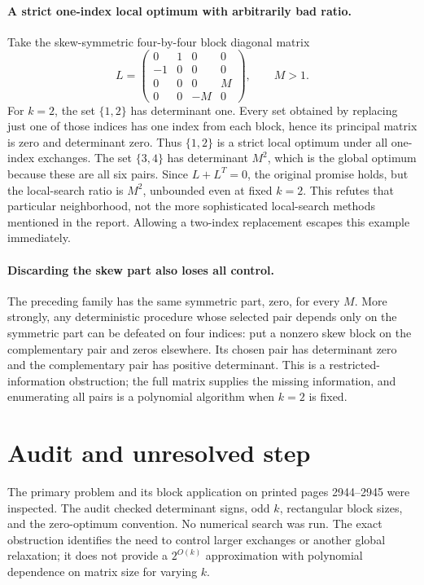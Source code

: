 \documentclass[11pt]{article}
\begin{document}
\paragraph{A strict one-index local optimum with arbitrarily bad ratio.}
Take the skew-symmetric four-by-four block diagonal matrix
\[
L=\begin{pmatrix}
0&1&0&0\\-1&0&0&0\\0&0&0&M\\0&0&-M&0
\end{pmatrix},\qquad M>1.
\]
For $k=2$, the set $\{1,2\}$ has determinant one. Every
set obtained by replacing just one of those indices has one index
from each block, hence its principal matrix is zero and determinant
zero. Thus $\{1,2\}$ is a strict local optimum under all
one-index exchanges. The set $\{3,4\}$ has determinant $M^2$,
which is the global optimum because these are all six pairs.
Since $L+L^T=0$, the original promise holds, but the local-search
ratio is $M^2$, unbounded even at fixed $k=2$.
This refutes that particular neighborhood, not the more sophisticated
local-search methods mentioned in the report. Allowing a two-index
replacement escapes this example immediately.

\paragraph{Discarding the skew part also loses all control.}
The preceding family has the same symmetric part, zero, for every
$M$. More strongly, any deterministic procedure whose selected pair depends only
on the symmetric part can be defeated on four indices: put a
nonzero skew block on the complementary pair and zeros elsewhere.
Its chosen pair has determinant zero and the complementary pair
has positive determinant. This is a restricted-information obstruction;
the full matrix supplies the missing information, and enumerating
all pairs is a polynomial algorithm when $k=2$ is fixed.

\section{Audit and unresolved step}
The primary problem and its block application on printed pages
2944--2945 were inspected. The audit checked determinant signs,
odd $k$, rectangular block sizes, and the zero-optimum convention.
No numerical search was run. The exact obstruction identifies the
need to control larger exchanges or another global relaxation; it
does not provide a $2^{O(k)}$ approximation with polynomial
dependence on matrix size for varying $k$.
\end{document}
